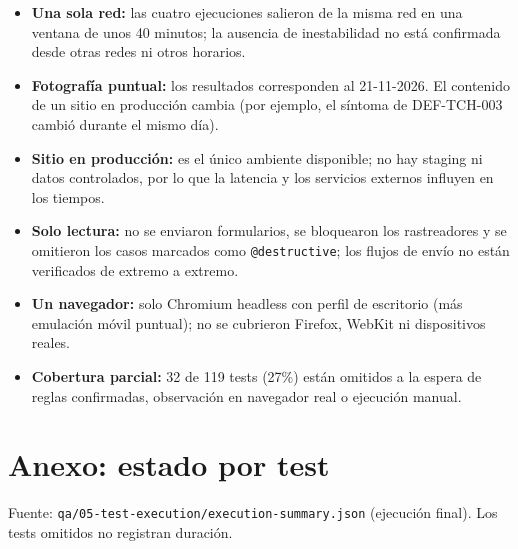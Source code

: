\documentclass[11pt,a4paper]{article}
\newcommand{\code}[1]{\texttt{#1}}
\begin{document}
\begin{itemize}
  \item \textbf{Una sola red:} las cuatro ejecuciones salieron de la misma red en una ventana de unos 40 minutos; la ausencia de inestabilidad no está confirmada desde otras redes ni otros horarios.
  \item \textbf{Fotografía puntual:} los resultados corresponden al 21-11-2026. El contenido de un sitio en producción cambia (por ejemplo, el síntoma de DEF-TCH-003 cambió durante el mismo día).
  \item \textbf{Sitio en producción:} es el único ambiente disponible; no hay staging ni datos controlados, por lo que la latencia y los servicios externos influyen en los tiempos.
  \item \textbf{Solo lectura:} no se enviaron formularios, se bloquearon los rastreadores y se omitieron los casos marcados como \code{@destructive}; los flujos de envío no están verificados de extremo a extremo.
  \item \textbf{Un navegador:} solo Chromium headless con perfil de escritorio (más emulación móvil puntual); no se cubrieron Firefox, WebKit ni dispositivos reales.
  \item \textbf{Cobertura parcial:} 32 de 119 tests (27\%) están omitidos a la espera de reglas confirmadas, observación en navegador real o ejecución manual.
\end{itemize}

\clearpage
\appendix
\section{Anexo: estado por test}

Fuente: \nolinkurl{qa/05-test-execution/execution-summary.json} (ejecución final). Los tests omitidos no registran duración.
\end{document}
